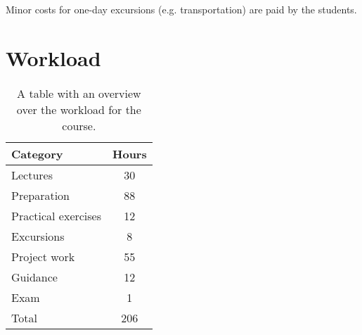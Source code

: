 Minor costs for one-day excursions (e.g. transportation) are paid by the students.

\section*{Workload}

\begin{table}[h]
    \centering
    \caption{A table with an overview over the workload for the course.}
    \label{tab:workload}
    \begin{tabular}{ l | c}
        \textbf{Category} & \textbf{Hours} \\ 
        \hline
        Lectures & 30 \\ 

        Preparation & 88 \\

        Practical exercises & 12 \\ 

        Excursions & 8 \\

        Project work & 55 \\

        Guidance & 12 \\

        Exam & 1 \\ 
        \hline
        Total & 206 \\ 
    \end{tabular}
\end{table}





\newpage